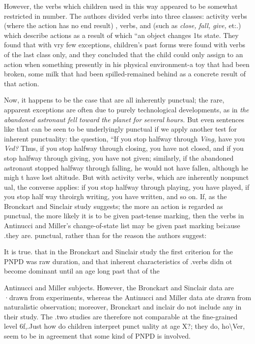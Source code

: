 However, the verbs which children used in this way appeared
to be somewhat restricted in number. The authors divided verbs into three classes: activity verbs (where the action has no end result) ,  verbs, and  (such as \textit{close,} \textit{fall,} \textit{give,} et:.) which describe actions as a result of which ``an object changes 1ts state. They found that with vry few exceptions, children's past
forms were found with verbs of the last class only, and they concluded that the child could only assign  to an action when some\-thing presently in his physical environment-a toy that had been broken, some milk that had been spilled-remained behind as a concrete result of that action.

Now, it happens to be the case that  are all inherently punctual; the rare, apparent exceptions are often due to purely technological developments, as in \textit{the} \textit{abandoned} \textit{astronaut} \textit{fell} \textit{toward} \textit{the} \textit{planet} \textit{for} \textit{several} \textit{hours.} But even sentences like that can be
seen to be underlyingly punctual if we apply another test for inherent punctuality: the question, ``If you stop halfway through \textit{Vi}\textit{n}\textit{g,} have you \textit{Ved?{\textquotedbl}} Thus, if you stop halfway through closing, you have not closed, and if you stop halfway through giving, you have not given; similarly, if the abandoned astronaut stopped halfway through falling, he would not have fallen, although he migh t have lost altitude. But with activity verbs, which are inherently nonpunct ual, the converse applies: if you stop halfway through playing, you have played, if you stop half\-
way throirgh writing, you have written, and so on. If, as the Bronckart
and Sinclair study suggests; the more an action is regarded as punctual,
the more likely it is to be given past-tense marking, then the verbs in
Antinucci and Miller's change-of-state list may be given past marking bei:ause .they are. punctual, rather than for the reason the authors suggest:
 

It is true. that in the Bronckart and Sinclair study the first cri\-terion for the PNPD was raw duration, and that inherent characteristics
of .verbs didn ot become dominant until an age long past that of the

Antinucci and Miller subjects. However, the Bronckart and Sinclair data are ·drawn from experiments, whereas the Antinucci and Miller data ate drawn from naturalistic observation; moreover, Bronckart and inclair do not include any  in their study. The .two studies are therefore not comparable at the fine-grained level 6f,.{\textquotedbl}Just how do children interpret punct uality at age X?{\textquotedbl}; they do, ho{\textbackslash}Ver, seem to be in agreement that some kind of PNPD is involved.

